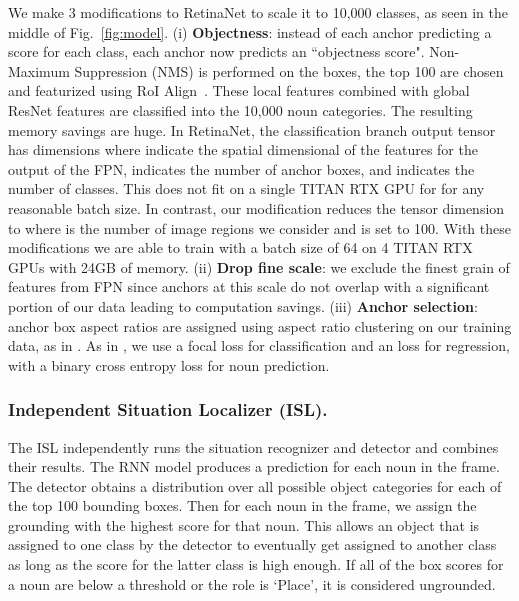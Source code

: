 \documentclass[runningheads]{llncs}
\begin{document}
We make 3 modifications to RetinaNet to scale it to 10,000 classes, as seen in the middle of Fig.~\ref{fig:model}. (i) \textbf{Objectness}: instead of each anchor predicting a score for each class, each anchor now predicts an ``objectness score". Non-Maximum Suppression (NMS) is performed on the boxes, the top 100 are chosen and featurized using RoI Align~\cite{fasterrcnn}. These local features combined with global ResNet features are classified into the 10,000 noun categories. The resulting memory savings are huge. In RetinaNet, the classification branch output tensor has dimensions  where  indicate the spatial dimensional of the features for the  output of the FPN,  indicates the number of anchor boxes, and  indicates the number of classes. This does not fit on a single TITAN RTX GPU for  for any reasonable batch size. In contrast, our modification reduces the tensor dimension to  where  is the number of image regions we consider and is set to 100. With these modifications we are able to train with a batch size of 64 on 4 TITAN RTX GPUs with 24GB of memory. (ii) \textbf{Drop fine scale}: we exclude the finest grain of features from FPN since anchors at this scale do not overlap with a significant portion of our data leading to computation savings. (iii) \textbf{Anchor selection}: anchor box aspect ratios are assigned using aspect ratio clustering on our training data, as in \cite{yolo}. As in \cite{retinanet}, we use a focal loss for classification and an  loss for regression, with a binary cross entropy loss for noun prediction.


\vspace{-5mm}
\subsubsection{Independent Situation Localizer (ISL). } 
The ISL independently runs the situation recognizer and detector and combines their results. The RNN model produces a prediction for each noun in the frame. The detector obtains a distribution over all possible object categories for each of the top 100 bounding boxes. Then for each noun in the frame, we assign the grounding with the highest score for that noun. This allows an object that is assigned to one class by the detector to eventually get assigned to another class as long as the score for the latter class is high enough. If all of the box scores for a noun are below a threshold or the role is `Place', it is considered ungrounded. 

\vspace{-5mm}
\end{document}
